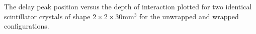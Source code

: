 \label{fig:centroidposition} The delay peak position versus the depth of interaction plotted for two identical scintillator crystals of shape $2\times2\times30$mm$^3$ for the unwrapped and wrapped configurations.